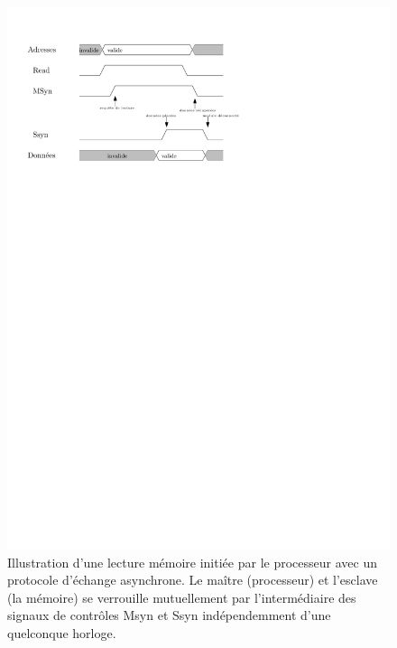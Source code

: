 \begin{figure}[htbp]
\includegraphics[width=\linewidth]{Figs/async_comm.pdf}
\caption{\label{fig:async_comm} Illustration d'une lecture mémoire initiée par le processeur avec un protocole d'échange asynchrone. Le maître (processeur) et l'esclave (la mémoire) se verrouille mutuellement par l'intermédiaire des signaux de contrôles Msyn et Ssyn indépendemment d'une quelconque horloge.}
\end{figure}

